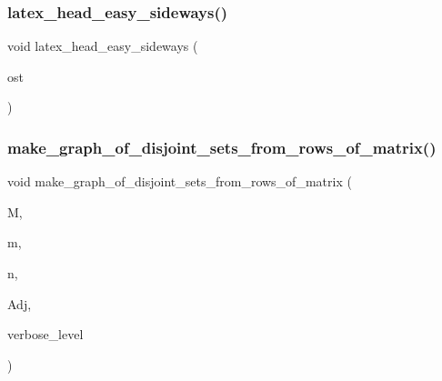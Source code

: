 \subsubsection{\texorpdfstring{latex\+\_\+head\+\_\+easy\+\_\+sideways()}{latex\_head\_easy\_sideways()}}
{\footnotesize\ttfamily void latex\+\_\+head\+\_\+easy\+\_\+sideways (\begin{DoxyParamCaption}\item[{ostream \&}]{ost }\end{DoxyParamCaption})}

\mbox{\label{util_8_c_a968faba640090d358c01fe35a81f4139}} 
\subsubsection{\texorpdfstring{make\+\_\+graph\+\_\+of\+\_\+disjoint\+\_\+sets\+\_\+from\+\_\+rows\+\_\+of\+\_\+matrix()}{make\_graph\_of\_disjoint\_sets\_from\_rows\_of\_matrix()}}
{\footnotesize\ttfamily void make\+\_\+graph\+\_\+of\+\_\+disjoint\+\_\+sets\+\_\+from\+\_\+rows\+\_\+of\+\_\+matrix (\begin{DoxyParamCaption}\item[{\mbox{\hyperlink{galois_8h_a09fddde158a3a20bd2dcadb609de11dc}{I\+NT}} $\ast$}]{M,  }\item[{\mbox{\hyperlink{galois_8h_a09fddde158a3a20bd2dcadb609de11dc}{I\+NT}}}]{m,  }\item[{\mbox{\hyperlink{galois_8h_a09fddde158a3a20bd2dcadb609de11dc}{I\+NT}}}]{n,  }\item[{\mbox{\hyperlink{galois_8h_a09fddde158a3a20bd2dcadb609de11dc}{I\+NT}} $\ast$\&}]{Adj,  }\item[{\mbox{\hyperlink{galois_8h_a09fddde158a3a20bd2dcadb609de11dc}{I\+NT}}}]{verbose\+\_\+level }\end{DoxyParamCaption})}

\mbox{\label{util_8_c_a3b046740630541f8d792ecc63c030fd4}} 
